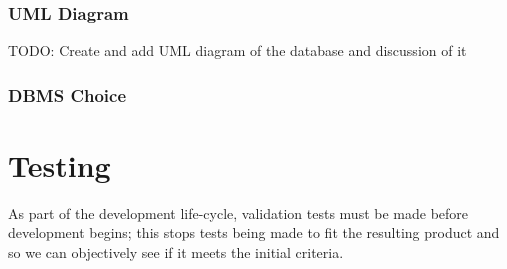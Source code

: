 \subsubsection{UML Diagram}
TODO: Create and add UML diagram of the database and discussion of it
\subsubsection{DBMS Choice}


\section{Testing} \label{sec:test-design}
As part of the development life-cycle, validation tests must be made before development begins; this stops tests being made to fit the resulting product and so we can objectively see if it meets the initial criteria.


